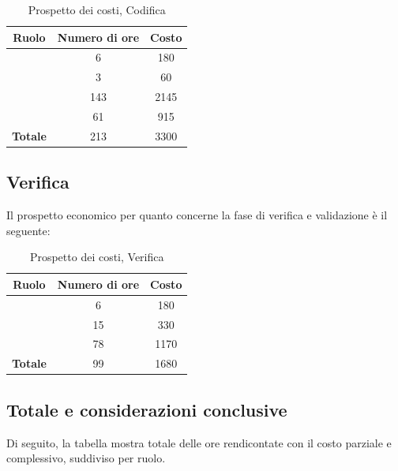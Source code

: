 \begin{table}[H]
	\begin{center}
		\begin{tabular}{|c|c|c|}
			\hline
			\textbf{Ruolo}	& \textbf{Numero di ore} & \textbf{Costo} \\
			\hline
			\Res	&	6  &	180	\\
			\hline
			\Amm	&	3  &	60	\\
			\hline
			\Progr	&	143  &	2145	\\
			\hline
			\Ver	&	61  &	915	\\
			\hline
			\textbf{Totale}  &	213 &	3300	\\
			\hline
		\end{tabular}
	\end{center}
	\caption{Prospetto dei costi, Codifica }
\end{table}


\subsection{Verifica}
Il prospetto economico per quanto concerne la fase di verifica e validazione è il seguente:


\begin{table}[H]
	\begin{center}
		\begin{tabular}{|c|c|c|}
			\hline
			\textbf{Ruolo}	& \textbf{Numero di ore} & \textbf{Costo} \\
			\hline
			\Res	&	6  &	180	\\
			\hline
			\Prog	&	15  &	330	\\
			\hline
			\Ver	&	78  &	1170	\\
			\hline
			\textbf{Totale}  &	99  &	1680	\\
			\hline
		\end{tabular}
	\end{center}
	\caption{Prospetto dei costi, Verifica }
\end{table}


\subsection{Totale e considerazioni conclusive}

Di seguito, la tabella mostra totale delle ore rendicontate con il costo parziale e complessivo, suddiviso per ruolo. 


